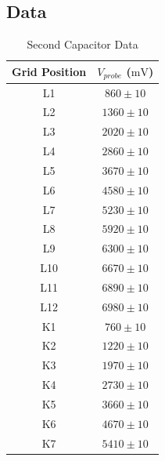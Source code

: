 \documentclass[10pt, twocolumn]{article}
\theoremstyle{definition}
\begin{document}
\subsection{Data}
\begin{table}[h]\centering
  \caption{Second Capacitor Data}
  \begin{tabular}{cc}
    \toprule
    \textbf{Grid Position} & \textbf{$V_{probe}$ ($\unit{\milli\volt}$)} \\
    \midrule
    L1                     & $860 \pm10$                                 \\
    L2                     & $1360 \pm10$                                \\
    L3                     & $2020\pm10$                                 \\
    L4                     & $2860\pm10$                                 \\
    L5                     & $3670\pm10$                                 \\
    L6                     & $4580\pm10$                                 \\
    L7                     & $5230\pm10$                                 \\
    L8                     & $5920\pm10$                                 \\
    L9                     & $6300\pm10$                                 \\
    L10                    & $6670\pm10$                                 \\
    L11                    & $6890\pm10$                                 \\
    L12                    & $6980\pm10$                                 \\
    K1                     & $760\pm10$                                  \\
    K2                     & $1220\pm10$                                 \\
    K3                     & $1970\pm10$                                 \\
    K4                     & $2730\pm10$                                 \\
    K5                     & $3660\pm10$                                 \\
    K6                     & $4670\pm10$                                 \\
    K7                     & $5410\pm10$                                 \\

\end{tabular}
\end{table}
\end{document}
